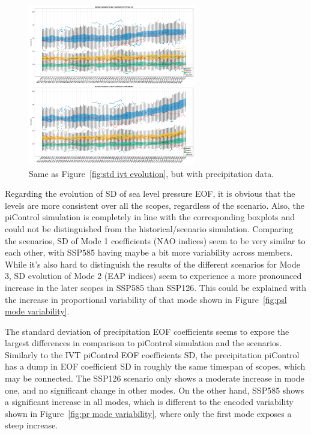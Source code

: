 \begin{figure}[htb]
  \begin{center}
    \includegraphics[width=0.65\textwidth]{figures/std_pr_50seasons_tempmodescale_3modes.png}
  \end{center}
  \caption{Same as Figure~\ref{fig:std ivt evolution}, but with precipitation data.}
  \label{fig:std pr evolution}
\end{figure}

Regarding the evolution of SD of sea level pressure EOF, it is obvious that the levels are more consistent over all the scopes, regardless of the scenario. 
Also, the piControl simulation is completely in line with the corresponding boxplots and could not be distinguished from the historical/scenario simulation. 
Comparing the scenarios, SD of Mode 1 coefficients (NAO indices) seem to be very similar to each other, with SSP585 having maybe a bit more variability across members. 
While it's also hard to distinguish the results of the different scenarios for Mode 3, SD evolution of Mode 2 (EAP indices) seem to experience a more pronounced increase in the later scopes in SSP585 than SSP126.  
This could be explained with the increase in proportional variability of that mode shown in Figure~\ref{fig:psl mode variability}.


The standard deviation of precipitation EOF coefficients seems to expose the largest differences in comparison to piControl simulation and the scenarios. 
Similarly to the IVT piControl EOF coefficients SD, the precipitation piControl has a dump in EOF coefficient SD in roughly the same timespan of scopes, which may be connected. 
The SSP126 scenario only shows a moderate increase in mode one, and no significant change in other modes. 
On the other hand, SSP585 shows a significant increase in all modes, which is different to the encoded variability shown in Figure~\ref{fig:pr mode variability}, where only the first mode exposes a steep increase. 

